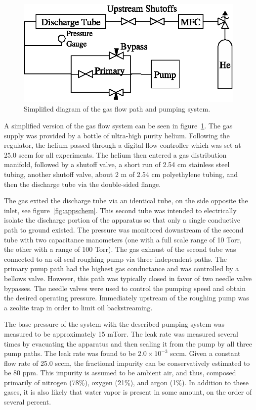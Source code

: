 \begin{figure}
  \centering
  \includegraphics{./chapters/experiment/figures/pump.eps}
  \caption{Simplified diagram of the gas flow path and pumping system.}
  \label{fig:pump}
\end{figure}
A simplified version of the gas flow system can be seen in
figure~\ref{fig:pump}. The gas supply was provided by a bottle of ultra-high
purity helium. Following the regulator, the helium passed through a digital flow
controller which was set at 25.0 sccm for all experiments. The helium then
entered a gas distribution manifold, followed by a shutoff valve, a short run of
2.54 cm stainless steel tubing, another shutoff valve, about 2 m of 2.54 cm
polyethylene tubing, and then the discharge tube via the double-sided flange.

The gas exited the discharge tube via an identical tube, on the side opposite
the inlet, see figure~\ref{fig:appschem}. This second tube was intended to
electrically isolate the discharge portion of the apparatus so that only a
single conductive path to ground existed. The pressure was monitored downstream
of the second tube with two capacitance manometers (one with a full scale range
of 10 Torr, the other with a range of 100 Torr). The gas exhaust of the second
tube was connected to an oil-seal roughing pump via three independent paths. The
primary pump path had the highest gas conductance and was controlled by a
bellows valve. However, this path was typically closed in favor of two needle
valve bypasses. The needle valves were used to control the pumping speed and
obtain the desired operating pressure. Immediately upstream of the roughing pump
was a zeolite trap in order to limit oil backstreaming.

The base pressure of the system with the described pumping system was measured
to be approximately 15 mTorr. The leak rate was measured several times by
evacuating the apparatus and then sealing it from the pump by all three pump
paths. The leak rate was found to be $2.0\times 10^{-3}$ sccm. Given a constant
flow rate of 25.0 sccm, the fractional impurity can be conservatively estimated
to be 80 ppm. This impurity is assumed to be ambient air, and thus, composed
primarily of nitrogen (78\%), oxygen (21\%), and argon (1\%). In addition to
these gases, it is also likely that water vapor is present in some amount, on
the order of several percent.


